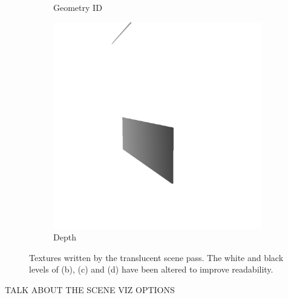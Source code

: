 \begin{figure}
\begin{subfigure}[t]{0.24\linewidth}
		\caption{Geometry ID}
		\label{worldposa_scenepass2}
	\end{subfigure}
	\begin{subfigure}[t]{0.24\linewidth}
		\includegraphics[width=\textwidth]{chapters/chapter_thetool/depth_scenepass2}
		\caption{Depth}
		\label{depth_scenepass2}
	\end{subfigure}

	\caption{Textures written by the translucent scene pass. The white and black levels of (b), (c) and (d) have been altered to improve readability.}
	\label{translucent_pass}
\end{figure}

TALK ABOUT THE SCENE VIZ OPTIONS

